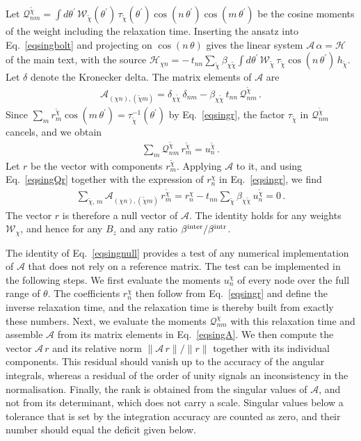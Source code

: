 \documentclass[aps,prb,onecolumn,nofootinbib,citeautoscript,10pt]{revtex4-2}
\begin{document}
Let $\mathcal Q^{\tilde\chi}_{nm}=\int d\theta^\prime\,\mathcal W_{\tilde\chi}(\theta^\prime)\,\tau_{\tilde\chi}(\theta^\prime)\cos(n\,\theta^\prime)\cos(m\,\theta^\prime)$ be the cosine moments of the weight including the relaxation time. Inserting the ansatz into Eq.~\eqref{eqsingbolt} and projecting on $\cos(n\,\theta)$ gives the linear system $\mathcal A\,\alpha=\mathcal H$ of the main text, with the source $\mathcal H_{\chi n}=-\,t_{nn}\sum_{\tilde\chi}\beta_{\chi\tilde\chi}\int d\theta^\prime\,\mathcal W_{\tilde\chi}\,\tau_{\tilde\chi}\cos(n\,\theta^\prime)\,h_{\tilde\chi}$. Let $\delta$ denote the Kronecker delta. The matrix elements of $\mathcal A$ are
\begin{align}
\mathcal A_{(\chi n),(\tilde\chi m)}=\delta_{\chi\tilde\chi}\,\delta_{nm}-\beta_{\chi\tilde\chi}\,t_{nn}\,\mathcal Q^{\tilde\chi}_{nm}\,.
\label{eqsingA}
\end{align}
Since $\sum_m r^{\tilde\chi}_m\cos(m\,\theta^\prime)=\tau_{\tilde\chi}^{-1}(\theta^\prime)$ by Eq.~\eqref{eqsingr}, the factor $\tau_{\tilde\chi}$ in $\mathcal Q^{\tilde\chi}_{nm}$ cancels, and we obtain
\begin{align}
\sum_m\mathcal Q^{\tilde\chi}_{nm}\,r^{\tilde\chi}_m=u^{\tilde\chi}_n\,.
\label{eqsingQr}
\end{align}
Let $r$ be the vector with components $r^{\tilde\chi}_m$. Applying $\mathcal A$ to it, and using Eq.~\eqref{eqsingQr} together with the expression of $r^\chi_n$ in Eq.~\eqref{eqsingr}, we find
\begin{align}
\sum_{\tilde\chi,\,m}\mathcal A_{(\chi n),(\tilde\chi m)}\,r^{\tilde\chi}_m=r^\chi_n-t_{nn}\sum_{\tilde\chi}\beta_{\chi\tilde\chi}\,u^{\tilde\chi}_n=0\,.
\label{eqsingnull}
\end{align}
The vector $r$ is therefore a null vector of $\mathcal A$. The identity holds for any weights $\mathcal W_\chi$, and hence for any $B_z$ and any ratio $\beta^{\rm inter}/\beta^{\rm intr}$.

The identity of Eq.~\eqref{eqsingnull} provides a test of any numerical implementation of $\mathcal A$ that does not rely on a reference matrix. The test can be implemented in the following steps. We first evaluate the moments $u^\chi_n$ of every node over the full range of $\theta$. The coefficients $r^\chi_n$ then follow from Eq.~\eqref{eqsingr} and define the inverse relaxation time, and the relaxation time is thereby built from exactly these numbers. Next, we evaluate the moments $\mathcal Q^\chi_{nm}$ with this relaxation time and assemble $\mathcal A$ from its matrix elements in Eq.~\eqref{eqsingA}. We then compute the vector $\mathcal A\,r$ and its relative norm $\lVert\mathcal A\,r\rVert/\lVert r\rVert$ together with its individual components. This residual should vanish up to the accuracy of the angular integrals, whereas a residual of the order of unity signals an inconsistency in the normalisation. Finally, the rank is obtained from the singular values of $\mathcal A$, and not from its determinant, which does not carry a scale. Singular values below a tolerance that is set by the integration accuracy are counted as zero, and their number should equal the deficit given below.
\end{document}
